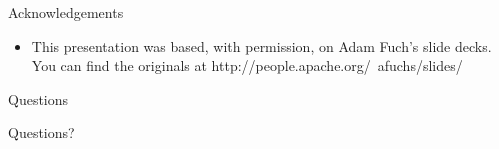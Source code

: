 \documentclass[t,landscape]{beamer}
\begin{document}
\begin{frame}{Acknowledgements}
  \begin{itemize}
  \item{This presentation was based, with permission, on Adam Fuch's slide decks. You can find the originals at http://people.apache.org/~afuchs/slides/}
  \end{itemize}
\end{frame}

\begin{frame}[c]{Questions}
  \begin{center}
  \large{Questions?}
  \end{center}
\end{frame}
\end{document}
